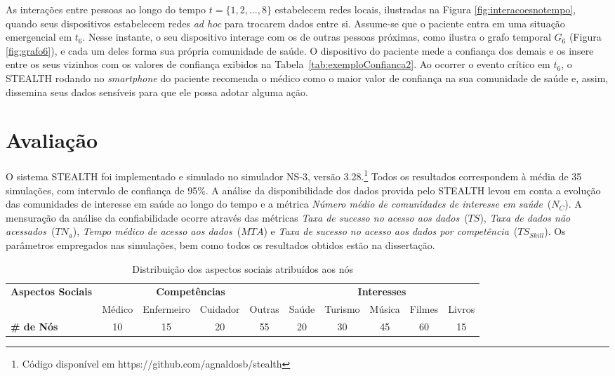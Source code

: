 \documentclass[12pt]{article}
\newcommand{\agn}[1]{\textcolor{auburn}{#1}}
\begin{document}
As interações entre pessoas ao longo do tempo $t = \{1,2,...,8\}$
estabelecem redes locais, ilustradas na Figura \ref{fig:interacoesnotempo}, quando seus dispositivos estabelecem redes \textit{ad hoc} para trocarem dados entre si. Assume-se que o paciente entra em uma situação emergencial em $t_6$. Nesse instante, o seu dispositivo interage com os de outras pessoas próximas, como ilustra o grafo temporal $G_6$ (Figura \ref{fig:grafo6}), e cada um deles forma sua própria comunidade de saúde. O dispositivo do paciente mede a confiança dos demais e os insere entre os seus vizinhos com os valores de confiança exibidos na  Tabela~\ref{tab:exemploConfianca2}. Ao ocorrer o evento crítico em $t_6$, o \mbox{STEALTH} rodando no \textit{smartphone} do paciente recomenda o médico como o maior valor de confiança na sua comunidade de saúde e, assim, dissemina seus dados sensíveis para que ele possa adotar alguma ação.

\section{Avaliação} \label{sec:aval}

O sistema \mbox{STEALTH} foi implementado e simulado no simulador NS-3, versão 3.28.\footnote{Código disponível em https://github.com/agnaldosb/stealth} Todos os resultados correspondem à média de 35 simulações, com intervalo de confiança de 95\%. A análise da disponibilidade dos dados provida pelo \mbox{STEALTH} levou em conta a evolução das comunidades de interesse em saúde ao longo do tempo e a métrica \textit{Número médio de comunidades de interesse em saúde}~($N_{C}$). A
\agn{mensuração da}
análise da confiabilidade
\agn{ocorre}
através das métricas \textit{Taxa de sucesso no acesso aos dados}~($TS$), \textit{Taxa de dados não acessados}~($TN_a$), \textit{Tempo médico de acesso aos dados}~($MTA$) e \textit{Taxa de sucesso no acesso aos dados por competência}~($TS_{Skill}$). Os parâmetros empregados nas simulações, bem como todos os resultados obtidos estão na dissertação.

\begin{table}[H]
\setlength{\extrarowheight}{2.0pt}
\centering
\caption{Distribuição dos aspectos sociais atribuídos aos nós}
\vspace{-0.2cm}
\label{tab:aspectosAtribuidos}
\begin{tabular}{|l|cccc|ccccc|}
\hline%
\multirow{2}{*}{\textbf{Aspectos Sociais}} & \multicolumn{4}{c|}{\textbf{Competências}} & \multicolumn{5}{c|}{\textbf{Interesses}} \\ \cline{2-10}
&Médico&Enfermeiro&Cuidador&Outras&Saúde&Turismo&Música&Filmes&Livros \\ \hline
\textbf{\# de Nós} &10&15&20&55&20&30&45&60&15 \\ 
\hline%
\end{tabular}
\end{table}
\end{document}
